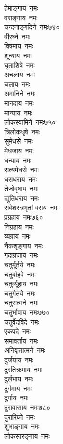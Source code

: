 \begin{multicols}{\maxColumns}
\begin{flushleft}
हेमाङ्गाय~नमः\\
वराङ्गाय~नमः\\
चन्दनाङ्गदिने~नमः\hfill ७४०\\
वीरघ्ने~नमः\\
विषमाय~नमः\\
शून्याय~नमः\\
घृताशिषे~नमः\\
अचलाय~नमः\\
चलाय~नमः\\
अमानिने~नमः\\
मानदाय~नमः\\
मान्याय~नमः\\
लोकस्वामिने~नमः\hfill ७५०\\
त्रिलोकधृषे~नमः\\
सुमेधसे~नमः\\
मेधजाय~नमः\\
धन्याय~नमः\\
सत्यमेधसे~नमः\\
धराधराय~नमः\\
तेजोवृषाय~नमः\\
द्युतिधराय~नमः\\
सर्वशस्त्रभृतां वराय~नमः\\
प्रग्रहाय~नमः\hfill ७६०\\
निग्रहाय~नमः\\
व्यग्राय~नमः\\
नैकशृङ्गाय~नमः\\
गदाग्रजाय~नमः\\
चतुर्मूर्तये~नमः\\
चतुर्बाहवे~नमः\\
चतुर्व्यूहाय~नमः\\
चतुर्गतये~नमः\\
चतुरात्मने~नमः\\
चतुर्भावाय~नमः\hfill ७७०\\
चतुर्वेदविदे~नमः\\
एकपदे~नमः\\
समावर्ताय~नमः\\
अनिवृत्तात्मने~नमः\\
दुर्जयाय~नमः\\
दुरतिक्रमाय~नमः\\
दुर्लभाय~नमः\\
दुर्गमाय~नमः\\
दुर्गाय~नमः\\
दुरावासाय~नमः\hfill ७८०\\
दुरारिघ्ने~नमः\\
शुभाङ्गाय~नमः\\
लोकसारङ्गाय~नमः\\

\end{flushleft}
\end{multicols}
